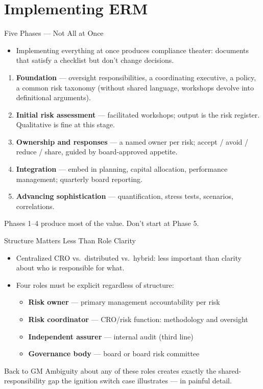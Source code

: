 \documentclass[11pt, aspectratio=169]{beamer}
\begin{document}
\section{Implementing ERM}

\begin{frame}{Five Phases --- Not All at Once}
\begin{itemize}
  \item Implementing everything at once produces \alert{compliance theater}: documents that satisfy a checklist but don't change decisions.
\end{itemize}
\medskip
\begin{enumerate}
  \item \textbf{Foundation} --- oversight responsibilities, a coordinating executive, a policy, a common \alert{risk taxonomy} (without shared language, workshops devolve into definitional arguments).
  \item \textbf{Initial risk assessment} --- facilitated workshops; output is the \alert{risk register}. Qualitative is fine at this stage.
  \item \textbf{Ownership and responses} --- a named owner per risk; accept / avoid / reduce / share, guided by board-approved appetite.
  \item \textbf{Integration} --- embed in planning, capital allocation, performance management; quarterly board reporting.
  \item \textbf{Advancing sophistication} --- quantification, stress tests, scenarios, correlations.
\end{enumerate}
\medskip
Phases 1--4 produce most of the value. Don't start at Phase 5.
\end{frame}

\begin{frame}{Structure Matters Less Than Role Clarity}
\begin{itemize}
  \item Centralized CRO vs.\ distributed vs.\ hybrid: less important than clarity about who is responsible for what.
  \item Four roles must be explicit regardless of structure:
  \begin{itemize}
    \item \textbf{Risk owner} --- primary management accountability per risk
    \item \textbf{Risk coordinator} --- CRO/risk function: methodology and oversight
    \item \textbf{Independent assurer} --- internal audit (third line)
    \item \textbf{Governance body} --- board or board risk committee
  \end{itemize}
\end{itemize}
\medskip
\begin{block}{Back to GM}
Ambiguity about any of these roles creates exactly the shared-responsibility gap the ignition switch case illustrates --- in painful detail.
\end{block}
\end{frame}
\end{document}
